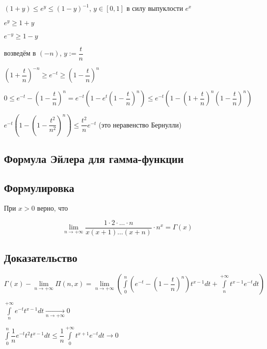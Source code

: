 \documentclass[../main.tex]{subfiles}
\begin{document}
                $(1 + y) \leq e^y \leq (1 - y)^{-1}$, $y \in [0, 1]$ в силу выпуклости $e^x$
                
                $e^y \geq 1 + y$
                
                $e^{-y} \geq 1 - y$
                
                возведём в $(-n)$, $y := \dfrac{t}{n}$
                
                $\left( 1 + \dfrac{t}{n} \right)^{-n} \geq e^{-t} \geq \left(1 - \dfrac{t}{n} \right)^n$
                
                $0 \leq e^{-t} - \left( 1 - \dfrac{t}{n} \right)^n = e^{-t} \left(1 - e^t \left(1 - \dfrac{t}{n} \right)^n \right) \leq e^{-t} \left(1 - \left(1 + \dfrac{t}{n} \right)^n \left( 1 - \dfrac{t}{n}\right)^n\right)$
                
                $e^{-t} \left(1 - \left(1 - \dfrac{t^2}{n^2} \right)^n \right) \leq \dfrac{t^2}{n} e^{-t}$ (это неравенство Бернулли)
          
\newpage


\subsection{Формула Эйлера для гамма-функции}

        \subsection*{Формулировка}
        
            При $x > 0$ верно, что
            
            $$\lim\limits_{n \rightarrow +\infty} \dfrac{1 \cdot 2 \cdot \ldots \cdot n}{x(x+1)\ldots(x+n)} \cdot n^x = \Gamma(x)$$
            
        \subsection*{Доказательство}
        
            $\Gamma(x) - \lim\limits_{n \rightarrow +\infty} \Pi(n, x) = \lim\limits_{n \rightarrow +\infty} \left( \int\limits^n_0 \left(e^{-t} - \left(1 - \dfrac{t}{n} \right)^n \right) t^{x - 1} dt + \int\limits^{+\infty}_n t^{x - 1} e^{-t} dt \right)$
            
            $\int\limits^{+\infty}_n e^{-t} t^{x - 1} dt \xrightarrow[n \rightarrow +\infty]{} 0$
            
            $\int\limits^n_0 \dfrac{1}{n} e^{-t} t^2 t^{x - 1} dt \leq \dfrac{1}{n} \int\limits^{+\infty}_0 t^{x + 1}e^{-t}dt \rightarrow 0$
            
\end{document}
